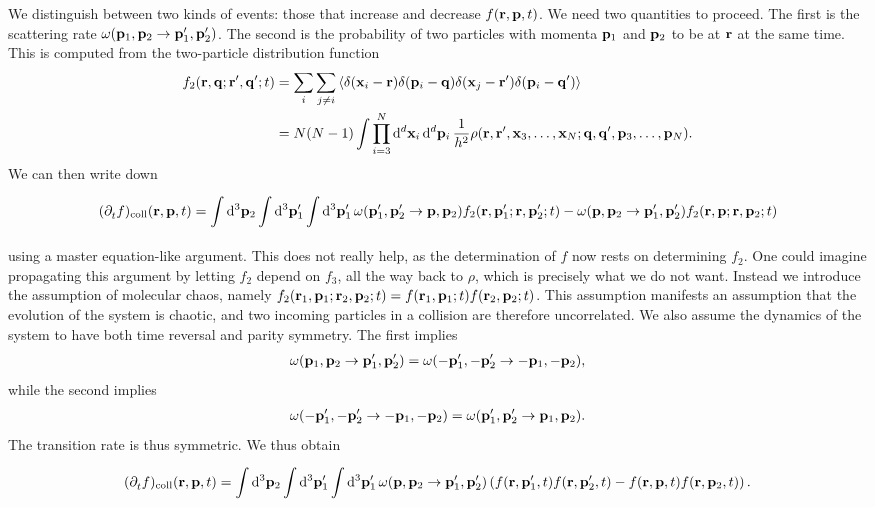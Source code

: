 We distinguish between two kinds of events: those that increase and decrease $f(\vb{r}, \vb{p}, t)$. We need two quantities to proceed. The first is the scattering rate $\omega(\vb{p}_{1}, \vb{p}_{2} \to \vb{p}_{1}^{\prime}, \vb{p}_{2}^{\prime})$. The second is the probability of two particles with momenta $\vb{p}_{1}$ and $\vb{p}_{2}$ to be at $\vb{r}$ at the same time. This is computed from the two-particle distribution function
\begin{align*}
	f_{2}(\vb{r}, \vb{q}; \vb{r}^{\prime}, \vb{q}^{\prime}; t) &= \sum\limits_{i}\sum\limits_{j\neq i}\expval{\delta(\vb{x}_{i} - \vb{r})\delta(\vb{p}_{i} - \vb{q})\delta(\vb{x}_{j} - \vb{r}\ensuremath{^{\prime}})\delta(\vb{p}_{i} - \vb{q}\ensuremath{^{\prime}})} \\
	                                             &= N(N - 1)\int\prod\limits_{i = 3}^{N}\dd[d]{\vb{x}_{i}}\dd[d]{\vb{p}_{i}}\frac{1}{h^{2}}\rho(\vb{r}, \vb{r}^{\prime}, \vb{x}_{3}, \dots, \vb{x}_{N}; \vb{q}, \vb{q}^{\prime}, \vb{p}_{3}, \dots, \vb{p}_{N}).
\end{align*}
We can then write down
\begin{align*}
	(\partial^{}_{t}{f})_{\text{coll}}(\vb{r}, \vb{p}, t) = \int\limits_{}^{}\dd[3]{\vb{p}_{2}}\int\limits_{}^{}\dd[3]{\vb{p}_{1}\ensuremath{^{\prime}}}\int\limits_{}^{}\dd[3]{\vb{p}_{1}\ensuremath{^{\prime}}}\omega(\vb{p}_{1}^{\prime}, \vb{p}_{2}^{\prime} \to \vb{p}, \vb{p}_{2})f_{2}(\vb{r}, \vb{p}_{1}^{\prime}; \vb{r}, \vb{p}_{2}^{\prime}; t) - \omega(\vb{p}, \vb{p}_{2} \to \vb{p}_{1}^{\prime}, \vb{p}_{2}^{\prime})f_{2}(\vb{r}, \vb{p}; \vb{r}, \vb{p}_{2}; t)
\end{align*}
using a master equation-like argument. This does not really help, as the determination of $f$ now rests on determining $f_{2}$. One could imagine propagating this argument by letting $f_{2}$ depend on $f_{3}$, all the way back to $\rho$, which is precisely what we do not want. Instead we introduce the assumption of molecular chaos, namely $f_{2}(\vb{r}_{1}, \vb{p}_{1}; \vb{r}_{2}, \vb{p}_{2}; t) = f(\vb{r}_{1}, \vb{p}_{1}; t)f(\vb{r}_{2}, \vb{p}_{2}; t)$. This assumption manifests an assumption that the evolution of the system is chaotic, and two incoming particles in a collision are therefore uncorrelated. We also assume the dynamics of the system to have both time reversal and parity symmetry. The first implies
\begin{align*}
	\omega(\vb{p}_{1}, \vb{p}_{2} \to \vb{p}_{1}^{\prime}, \vb{p}_{2}^{\prime}) = \omega(-\vb{p}_{1}^{\prime}, -\vb{p}_{2}^{\prime} \to -\vb{p}_{1}, -\vb{p}_{2}),
\end{align*}
while the second implies
\begin{align*}
	\omega(-\vb{p}_{1}^{\prime}, -\vb{p}_{2}^{\prime} \to -\vb{p}_{1}, -\vb{p}_{2}) = \omega(\vb{p}_{1}^{\prime}, \vb{p}_{2}^{\prime} \to \vb{p}_{1}, \vb{p}_{2}).
\end{align*}
The transition rate is thus symmetric. We thus obtain
\begin{align*}
	(\partial^{}_{t}{f})_{\text{coll}}(\vb{r}, \vb{p}, t) = \int\limits_{}^{}\dd[3]{\vb{p}_{2}}\int\limits_{}^{}\dd[3]{\vb{p}_{1}\ensuremath{^{\prime}}}\int\limits_{}^{}\dd[3]{\vb{p}_{1}\ensuremath{^{\prime}}}\omega(\vb{p}, \vb{p}_{2} \to \vb{p}_{1}^{\prime}, \vb{p}_{2}^{\prime})\left(f(\vb{r}, \vb{p}_{1}^{\prime}, t)f(\vb{r}, \vb{p}_{2}^{\prime}, t) - f(\vb{r}, \vb{p}, t)f(\vb{r}, \vb{p}_{2}, t)\right).
\end{align*}

